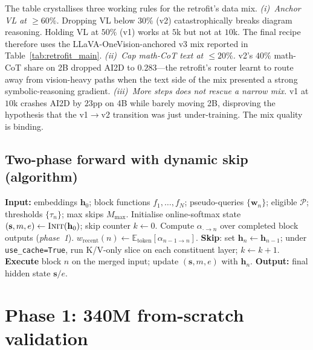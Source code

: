 \documentclass{article}
\newcommand{\attnres}{\textsc{AttnRes}}
\newcommand{\reskip}{\textsc{ReSkip}}
\newcommand{\E}{\mathbb{E}}
\begin{document}
The table crystallises three working rules for the retrofit's data mix.
\emph{(i)~Anchor VL at $\geq 60\%$.} Dropping VL below $30\%$ (v2) catastrophically breaks diagram reasoning. Holding VL at $50\%$ (v1) works at $5$k but not at $10$k. The final recipe therefore uses the LLaVA-OneVision-anchored v3 mix reported in Table~\ref{tab:retrofit_main}.
\emph{(ii)~Cap math-CoT text at $\leq 20\%$.} v2's $40\%$ math-CoT share on 2B dropped AI2D to $0.283$---the retrofit's router learnt to route away from vision-heavy paths when the text side of the mix presented a strong symbolic-reasoning gradient.
\emph{(iii)~More steps does not rescue a narrow mix.} v1 at $10$k crashes AI2D by $23$pp on 4B while barely moving 2B, disproving the hypothesis that the v1$\to$v2 transition was just under-training. The mix quality is binding.

\subsection{Two-phase forward with dynamic skip (algorithm)}
\label{app:algorithm}
\begin{algorithm}[h]
\caption{Two-phase \attnres{} forward with dynamic \reskip{}.}
\label{alg:two_phase}
\begin{algorithmic}[1]
\STATE \textbf{Input:} embeddings $\mathbf{h}_0$; block functions $f_1,\dots,f_N$; pseudo-queries $\{\mathbf{w}_n\}$; eligible $\mathcal{P}$; thresholds $\{\tau_n\}$; max skips $M_{\max}$.
\STATE Initialise online-softmax state $(\mathbf{s}, m, e) \gets \textsc{Init}(\mathbf{h}_0)$; skip counter $k \gets 0$.
  \STATE Compute $\alpha_{\cdot \to n}$ over completed block outputs (\emph{phase~1}).
  \STATE $w_{\text{recent}}(n) \gets \E_{\text{token}}[\alpha_{n-1\to n}]$.
    \STATE \textbf{Skip}: set $\mathbf{h}_n \gets \mathbf{h}_{n-1}$; under \texttt{use\_cache=True}, run K/V-only slice on each constituent layer; $k \gets k+1$.
  \ELSE
    \STATE \textbf{Execute} block $n$ on the merged input; update $(\mathbf{s},m,e)$ with $\mathbf{h}_n$.
  \ENDIF
\ENDFOR
\STATE \textbf{Output:} final hidden state $\mathbf{s}/e$.
\end{algorithmic}
\end{algorithm}

\section{Phase 1: 340M from-scratch validation}
\label{app:phase1_section}
\end{document}
